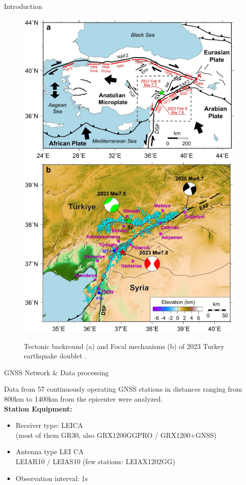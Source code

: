 \documentclass[final,a0,portrait]{beamer}
\newlength{\onecolwid}
\begin{document}
\begin{frame}[t]
\begin{columns}[t]
\begin{column}{\onecolwid}
\begin{block}{Introduction}
\begin{figure}
\begin{center}
  \includegraphics[width=.54\textwidth]{figures/eqturk23_tect.png}
  \includegraphics[width=.44\textwidth]{figures/eqturk23_fm.png}
\end{center}
    \caption{Tectonic backround (a) and Focal mechanisms (b) of 2023 Turkey earthquake doublet \cite{Liu_2023}.}
    \label{fig:proc-net}
\end{figure} 
\end{block}
\begin{block}{GNSS Network \& Data processing}
{\small
Data from 57 continuously operating GNSS stations in distances ranging from 800km to 1400km from the epicenter were analyzed.\\
\textbf{Station Equipment:}
\begin{itemize}\setlength\itemsep{.3em}
  \item Receiver type: LEICA\\
    (most of them GR30, also GRX1200GGPRO / GRX1200+GNSS)
  \item Antenna type LEI CA\\
    LEIAR10 / LEIAS10 (few stations: LEIAX1202GG)
  \item Observation interval: 1s
\end{itemize}

}
\end{block}
\end{column}
\end{columns}
\end{frame}
\end{document}
